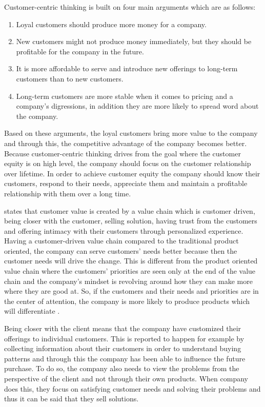 Customer-centric thinking is built on four main arguments which are as follows:
\begin{enumerate}
\item Loyal customers should produce more money for a company.
\item New customers might not produce money immediately, but they should be profitable for the company in the future.
\item  It is more affordable to serve and introduce new offerings to long-term customers than to new customers.
\item  Long-term customers are more stable when it comes to pricing and a company's digressions, in addition they are more likely to spread word about the company. \parencite{Parniangtong:2017}
\end{enumerate}

Based on these arguments, the loyal customers bring more value to the company and through this, the competitive advantage of the company becomes better. Because customer-centric thinking drives from the goal where the customer equity is on high level, the company should focus on the customer relationship over lifetime. In order to achieve customer equity the company should know their customers, respond to their needs, appreciate them and maintain a profitable relationship with them over a long time. \parencite{Parniangtong:2017}

\textcite{Parniangtong:2017} states that customer value is created by a value chain which is customer driven, being closer with the customer, selling solution, having trust from the customers and offering intimacy with their customers through personalized experience. Having a customer-driven value chain compared to the traditional product oriented, the company can serve customers' needs better because then the customer needs will drive the change. This is different from the product oriented value chain where the customers' priorities are seen only at the end of the value chain and the company's mindset is revolving around how they can make more where they are good at. So, if the customers and their needs and priorities are in the center of attention, the company is more likely to produce products which will differentiate \parencite{Parniangtong:2017}.

Being closer with the client means that the company have customized their offerings to individual customers. This is reported to happen for example by collecting information about their customers in order to understand buying patterns and through this the company has been able to influence the future purchase. To do so, the company also needs to view the problems from the perspective of the client and not through their own products. When company does this, they focus on satisfying customer needs and solving their problems and thus it can be said that they sell solutions. \parencite{Parniangtong:2017}

